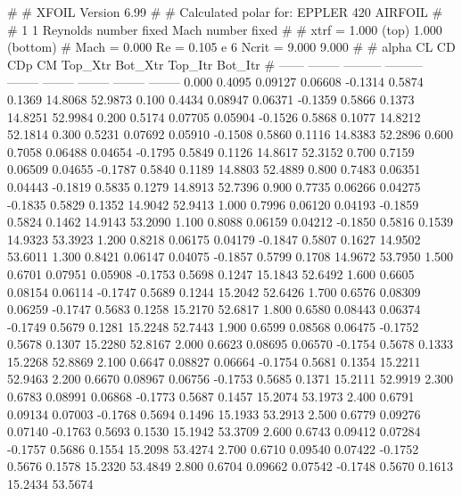 #  
#       XFOIL         Version 6.99
#  
# Calculated polar for: EPPLER 420 AIRFOIL                              
#  
# 1 1 Reynolds number fixed          Mach number fixed         
#  
# xtrf =   1.000 (top)        1.000 (bottom)  
# Mach =   0.000     Re =     0.105 e 6     Ncrit =   9.000  9.000
#  
#   alpha    CL        CD       CDp       CM     Top_Xtr  Bot_Xtr  Top_Itr  Bot_Itr
#  ------ -------- --------- --------- -------- -------- -------- -------- --------
   0.000   0.4095   0.09127   0.06608  -0.1314   0.5874   0.1369  14.8068  52.9873
   0.100   0.4434   0.08947   0.06371  -0.1359   0.5866   0.1373  14.8251  52.9984
   0.200   0.5174   0.07705   0.05904  -0.1526   0.5868   0.1077  14.8212  52.1814
   0.300   0.5231   0.07692   0.05910  -0.1508   0.5860   0.1116  14.8383  52.2896
   0.600   0.7058   0.06488   0.04654  -0.1795   0.5849   0.1126  14.8617  52.3152
   0.700   0.7159   0.06509   0.04655  -0.1787   0.5840   0.1189  14.8803  52.4889
   0.800   0.7483   0.06351   0.04443  -0.1819   0.5835   0.1279  14.8913  52.7396
   0.900   0.7735   0.06266   0.04275  -0.1835   0.5829   0.1352  14.9042  52.9413
   1.000   0.7996   0.06120   0.04193  -0.1859   0.5824   0.1462  14.9143  53.2090
   1.100   0.8088   0.06159   0.04212  -0.1850   0.5816   0.1539  14.9323  53.3923
   1.200   0.8218   0.06175   0.04179  -0.1847   0.5807   0.1627  14.9502  53.6011
   1.300   0.8421   0.06147   0.04075  -0.1857   0.5799   0.1708  14.9672  53.7950
   1.500   0.6701   0.07951   0.05908  -0.1753   0.5698   0.1247  15.1843  52.6492
   1.600   0.6605   0.08154   0.06114  -0.1747   0.5689   0.1244  15.2042  52.6426
   1.700   0.6576   0.08309   0.06259  -0.1747   0.5683   0.1258  15.2170  52.6817
   1.800   0.6580   0.08443   0.06374  -0.1749   0.5679   0.1281  15.2248  52.7443
   1.900   0.6599   0.08568   0.06475  -0.1752   0.5678   0.1307  15.2280  52.8167
   2.000   0.6623   0.08695   0.06570  -0.1754   0.5678   0.1333  15.2268  52.8869
   2.100   0.6647   0.08827   0.06664  -0.1754   0.5681   0.1354  15.2211  52.9463
   2.200   0.6670   0.08967   0.06756  -0.1753   0.5685   0.1371  15.2111  52.9919
   2.300   0.6783   0.08991   0.06868  -0.1773   0.5687   0.1457  15.2074  53.1973
   2.400   0.6791   0.09134   0.07003  -0.1768   0.5694   0.1496  15.1933  53.2913
   2.500   0.6779   0.09276   0.07140  -0.1763   0.5693   0.1530  15.1942  53.3709
   2.600   0.6743   0.09412   0.07284  -0.1757   0.5686   0.1554  15.2098  53.4274
   2.700   0.6710   0.09540   0.07422  -0.1752   0.5676   0.1578  15.2320  53.4849
   2.800   0.6704   0.09662   0.07542  -0.1748   0.5670   0.1613  15.2434  53.5674
